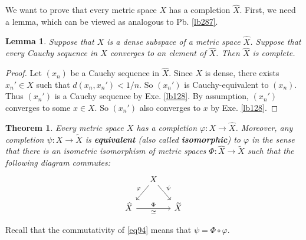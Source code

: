 \documentclass[12pt,b5paper,notitlepage]{article}
\theoremstyle{definition}
\theoremstyle{plain}
\newtheorem{thm}[df]{Theorem}
\newtheorem{lm}[df]{Lemma}
\newcommand{\wtd}{\widetilde}
\newcommand{\wht}{\widehat}
\numberwithin{equation}{section}
\begin{document}
We want to prove that every metric space $X$ has a completion $\wht X$. First, we need a lemma, which can be viewed as analogous to Pb. \ref{lb287}.

\begin{lm}\label{lb300}
Suppose that $X$ is a dense subspace of a metric space $\wht X$. Suppose that every Cauchy sequence in $X$ converges to an element of $\wht X$. Then $\wht X$ is complete.
\end{lm}

\begin{proof}
Let $(x_n)$ be a Cauchy sequence in $\wht X$. Since $X$ is dense, there exists $x_n'\in X$ such that $d(x_n,x_n')<1/n$. So $(x_n')$ is Cauchy-equivalent to $(x_n)$. Thus $(x_n')$ is a Cauchy sequence by Exe. \ref{lb128}. By assumption, $(x_n')$ converges to some $x\in X$. So $(x_n')$ also converges to $x$ by Exe. \ref{lb128}.
\end{proof}



\begin{thm}\label{lb301}
Every metric space $X$ has a completion $\varphi:X\rightarrow\wht X$. Moreover, any completion $\psi:X\rightarrow\wtd X$ is \textbf{equivalent} (also called \textbf{isomorphic}) to $\varphi$ in the sense that there is an isometric isomorphism of metric spaces $\Phi:\wht X\rightarrow\wtd X$ such that the following diagram commutes:
\begin{equation}\label{eq94}
\begin{tikzcd}[column sep=small]
                     & X \arrow[ld,"\varphi"'] \arrow[rd,"\psi"] &   \\
\wht X \arrow[rr, "\Phi","\simeq"'] &                         & \wtd X
\end{tikzcd}
\end{equation}
\end{thm}


Recall that the commutativity of \eqref{eq94} means that $\psi=\Phi\circ\varphi$.
\end{document}
